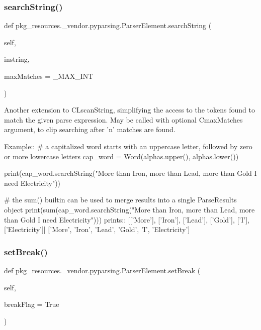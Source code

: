 \subsubsection{\texorpdfstring{search\+String()}{searchString()}}
{\footnotesize\ttfamily def pkg\+\_\+resources.\+\_\+vendor.\+pyparsing.\+Parser\+Element.\+search\+String (\begin{DoxyParamCaption}\item[{}]{self,  }\item[{}]{instring,  }\item[{}]{max\+Matches = {\ttfamily \+\_\+MAX\+\_\+INT} }\end{DoxyParamCaption})}

\begin{DoxyVerb}Another extension to C{L{scanString}}, simplifying the access to the tokens found
to match the given parse expression.  May be called with optional
C{maxMatches} argument, to clip searching after 'n' matches are found.

Example::
    # a capitalized word starts with an uppercase letter, followed by zero or more lowercase letters
    cap_word = Word(alphas.upper(), alphas.lower())
    
    print(cap_word.searchString("More than Iron, more than Lead, more than Gold I need Electricity"))

    # the sum() builtin can be used to merge results into a single ParseResults object
    print(sum(cap_word.searchString("More than Iron, more than Lead, more than Gold I need Electricity")))
prints::
    [['More'], ['Iron'], ['Lead'], ['Gold'], ['I'], ['Electricity']]
    ['More', 'Iron', 'Lead', 'Gold', 'I', 'Electricity']
\end{DoxyVerb}
 \mbox{\label{classpkg__resources_1_1__vendor_1_1pyparsing_1_1ParserElement_a28cc2d9e28a3a71517249b2e9e5df9d5}} 
\subsubsection{\texorpdfstring{set\+Break()}{setBreak()}}
{\footnotesize\ttfamily def pkg\+\_\+resources.\+\_\+vendor.\+pyparsing.\+Parser\+Element.\+set\+Break (\begin{DoxyParamCaption}\item[{}]{self,  }\item[{}]{break\+Flag = {\ttfamily True} }\end{DoxyParamCaption})}

